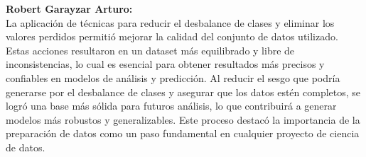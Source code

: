 \documentclass{article}
\begin{document}
    \textbf{\Large Robert Garayzar Arturo:} \\
    
    La aplicación de técnicas para reducir el desbalance de clases y eliminar los valores perdidos permitió mejorar la calidad del conjunto de datos utilizado. Estas acciones resultaron en un dataset más equilibrado y libre de inconsistencias, lo cual es esencial para obtener resultados más precisos y confiables en modelos de análisis y predicción. Al reducir el sesgo que podría generarse por el desbalance de clases y asegurar que los datos estén completos, se logró una base más sólida para futuros análisis, lo que contribuirá a generar modelos más robustos y generalizables. Este proceso destacó la importancia de la preparación de datos como un paso fundamental en cualquier proyecto de ciencia de datos. \\
    
    
\end{document}
